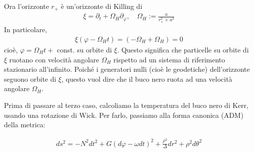 \documentclass{report}
\begin{document}
\begin{enumerate}
    Ora l'orizzonte \(r_+\) è un'orizzonte di Killing di 
    \begin{align}
        \xi = \partial_t + \Omega_H \partial_\varphi, \quad \Omega_H := \frac{a}{r^2_+ + a^2}
    \end{align}
    In particolare, 
    \begin{align}
        \xi(\varphi - \Omega_H t) = (-\Omega_H + \Omega_H) = 0
    \end{align}
    cioè, \(\varphi = \Omega_H t + \) const. su orbite di \(\xi\). Questo significa che particelle su orbite di \(\xi\) ruotano con velocità angolare \(\Omega_H\) rispetto ad un sistema di riferimento stazionario all'infinito. Poiché i generatori nulli (cioè le geodetiche) dell'orizzonte seguono orbite di \(\xi\), questo vuol dire che il buco nero ruota ad una velocità angolare \(\Omega_H\). 

    Prima di passare al terzo caso, calcoliamo la temperatura del buco nero di Kerr, usando una rotazione di Wick. Per farlo, passiamo alla forma canonica (ADM) della metrica: 

    \begin{align}
        ds^2 = -N^2dt^2 + G(d\varphi - \omega dt)^2 + \frac{\rho^2}{\Delta}dr^2 + \rho^2d\theta^2
    \end{align}


\end{enumerate}
\end{document}
